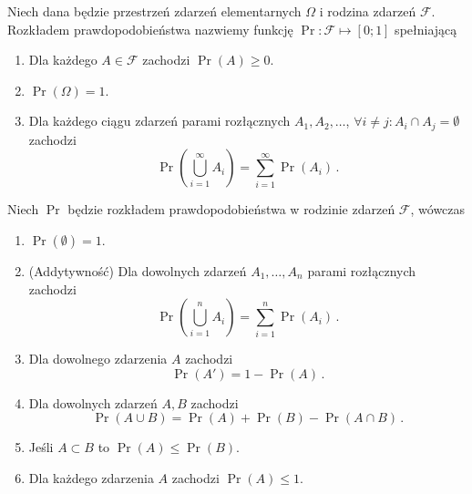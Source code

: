 \documentclass{myclass}
\numberwithin{equation}{subsection}
\begin{document}
\begin{definition}
Niech dana będzie przestrzeń zdarzeń elementarnych \(\Omega\) i rodzina zdarzeń \(\mathcal{F}\).
Rozkładem prawdopodobieństwa nazwiemy funkcję \(\Pr: \mathcal{F} \mapsto [0;1]\) spełniającą
\begin{enumerate}
    
    \item Dla każdego \(A \in \mathcal{F}\) zachodzi \(\Pr(A) \geq 0\).
    
    \item \(\Pr(\Omega) = 1\).
    
    \item Dla każdego ciągu zdarzeń parami rozłącznych \(A_1,A_2,\ldots\), \(\forall i \neq j : A_i
    \cap A_j = \emptyset\) zachodzi
    \begin{equation*}
        \Pr\left(\bigcup_{i=1}^\infty A_i\right) = \sum_{i=1}^\infty \Pr(A_i)\,.
    \end{equation*}

\end{enumerate}
\end{definition}

\begin{theorem}
Niech \(\Pr\) będzie rozkładem prawdopodobieństwa w rodzinie zdarzeń \(\mathcal{F}\), wówczas

\begin{enumerate}
    
    \item \(\Pr(\emptyset) = 1\).
    
    \item (Addytywność) Dla dowolnych zdarzeń \(A_1,\ldots,A_n\) parami rozłącznych zachodzi
    \begin{equation*}
        \Pr\left(\bigcup_{i=1}^n A_i\right) = \sum_{i=1}^n \Pr(A_i)\,.
    \end{equation*}

    \item Dla dowolnego zdarzenia \(A\) zachodzi
    \begin{equation*}
        \Pr(A') = 1 - \Pr(A)\,.
    \end{equation*}

    \item Dla dowolnych zdarzeń \(A, B\) zachodzi
    \begin{equation*}
        \Pr(A \cup B) = \Pr(A) + \Pr(B) - \Pr(A \cap B)\,.
    \end{equation*}

    \item Jeśli \(A \subset B\) to \(\Pr(A) \leq \Pr(B)\).

    \item Dla każdego zdarzenia \(A\) zachodzi \(\Pr(A) \leq 1\).

\end{enumerate}
\end{theorem}
\end{document}
